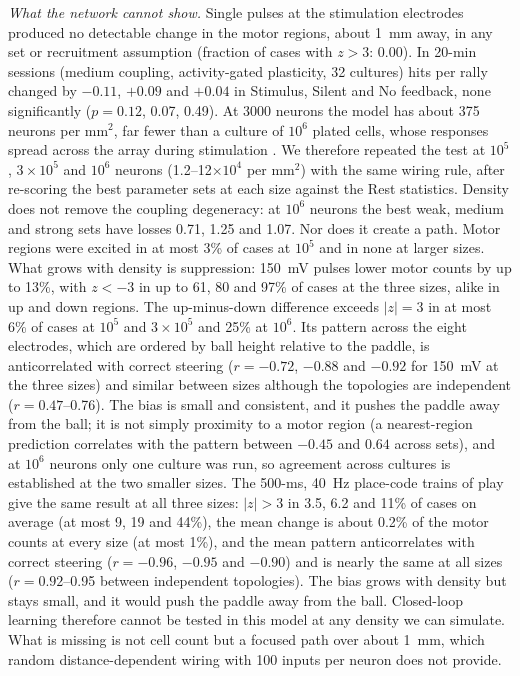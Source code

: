 \documentclass[pre,twocolumn,superscriptaddress,showpacs=false,amsmath,amssymb,nofootinbib]{revtex4-2}
\begin{document}
\emph{What the network cannot show.} Single pulses at the stimulation electrodes produced no detectable change in the motor regions, about 1~mm away, in any set or recruitment assumption (fraction of cases with $z>3$: 0.00). In 20-min sessions (medium coupling, activity-gated plasticity, 32 cultures) hits per rally changed by $-0.11$, $+0.09$ and $+0.04$ in Stimulus, Silent and No feedback, none significantly ($p=0.12$, 0.07, 0.49). At 3000 neurons the model has about 375 neurons per mm$^2$, far fewer than a culture of $10^6$ plated cells, whose responses spread across the array during stimulation \cite{Kagan2022}. We therefore repeated the test at $10^5$, $3\times10^5$ and $10^6$ neurons (1.2--12$\times10^4$ per mm$^2$) with the same wiring rule, after re-scoring the best parameter sets at each size against the Rest statistics. Density does not remove the coupling degeneracy: at $10^6$ neurons the best weak, medium and strong sets have losses 0.71, 1.25 and 1.07. Nor does it create a path. Motor regions were excited in at most 3\% of cases at $10^5$ and in none at larger sizes. What grows with density is suppression: 150~mV pulses lower motor counts by up to 13\%, with $z<-3$ in up to 61, 80 and 97\% of cases at the three sizes, alike in up and down regions. The up-minus-down difference exceeds $|z|=3$ in at most 6\% of cases at $10^5$ and $3\times10^5$ and 25\% at $10^6$. Its pattern across the eight electrodes, which are ordered by ball height relative to the paddle, is anticorrelated with correct steering ($r=-0.72$, $-0.88$ and $-0.92$ for 150~mV at the three sizes) and similar between sizes although the topologies are independent ($r=0.47$--0.76). The bias is small and consistent, and it pushes the paddle away from the ball; it is not simply proximity to a motor region (a nearest-region prediction correlates with the pattern between $-0.45$ and $0.64$ across sets), and at $10^6$ neurons only one culture was run, so agreement across cultures is established at the two smaller sizes. The 500-ms, 40~Hz place-code trains of play give the same result at all three sizes: $|z|>3$ in 3.5, 6.2 and 11\% of cases on average (at most 9, 19 and 44\%), the mean change is about 0.2\% of the motor counts at every size (at most 1\%), and the mean pattern anticorrelates with correct steering ($r=-0.96$, $-0.95$ and $-0.90$) and is nearly the same at all sizes ($r=0.92$--0.95 between independent topologies). The bias grows with density but stays small, and it would push the paddle away from the ball. Closed-loop learning therefore cannot be tested in this model at any density we can simulate. What is missing is not cell count but a focused path over about 1~mm, which random distance-dependent wiring with 100 inputs per neuron does not provide.
\end{document}
